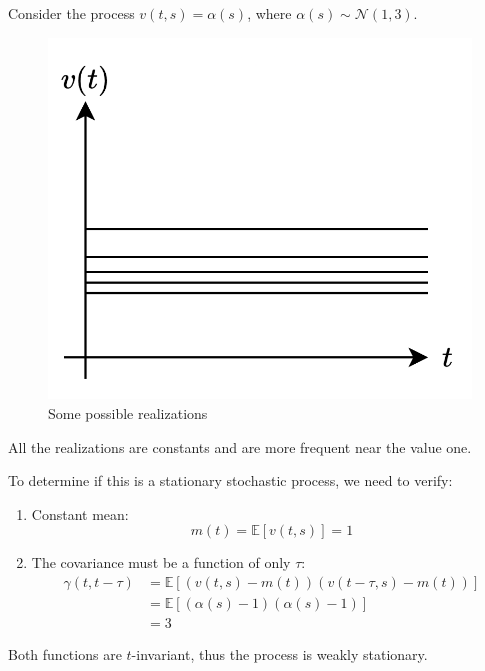 \begin{example}
    Consider the process $v(t,s)=\alpha(s)$, where $\alpha(s) \sim \mathcal{N}(1,3)$. 
    \begin{figure}[H]
        \centering
        \includegraphics[width=0.35\linewidth]{images/static.png}
        \caption{Some possible realizations}
    \end{figure}
    All the realizations are constants and are more frequent near the value one.

    To determine if this is a stationary stochastic process, we need to verify: 
    \begin{enumerate}
        \item Constant mean: 
            \[m(t)=\mathbb{E}\left[v(t,s)\right]=1\]
        \item The covariance must be a function of only $\tau$: 
            \begin{align*}
                \gamma(t,t-\tau)&=\mathbb{E}\left[\left(v(t,s)-m(t)\right)\left(v(t-\tau,s)-m(t)\right)\right] \\
                                &=\mathbb{E}\left[\left(\alpha(s)-1\right)\left(\alpha(s)-1\right)\right] \\
                                &=3
            \end{align*}
    \end{enumerate}
    Both functions are $t$-invariant, thus the process is weakly stationary.
\end{example}


